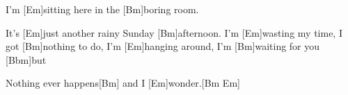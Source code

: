 

\hfill{}

\begin{guitar}

	I'm [Em]sitting here in the [Bm]boring room.
\end{guitar}
	
\vspace{-2.875em} \hfill {}
\vspace{-0.125em} 
	
\begin{guitar}
	It's [Em]just another rainy Sunday [Bm]afternoon.
	I'm [Em]wasting my time, I got [Bm]nothing to do,
	I'm [Em]hanging around, I'm [Bm]waiting for you [Bbm]but
\end{guitar}

\vspace{-2.875em} \hfill {}
\vspace{-0.125em} 

\begin{guitar}
	[Am]Nothing ever happens[Bm] and I [Em]wonder.[Bm Em]{}
\end{guitar}

\vspace{-2.875em} \hfill {}
\vspace{-0.125em} 

